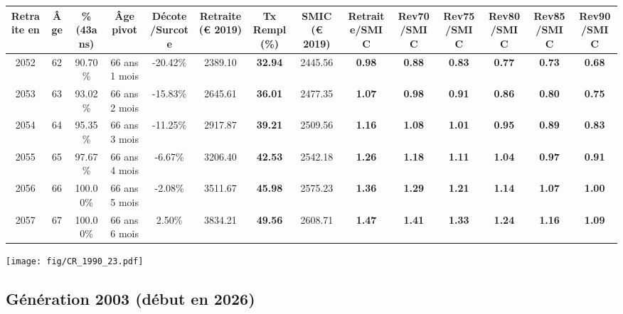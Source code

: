 \begin{adjustbox}{max width=\textwidth} 
\begin{tabular}[htb]{|c|c||c|c|c||c|c||c||c|c|c|c|c|c|} 
\hline 
 Retraite en &  Âge &  \%(43ans) &  Âge pivot &  Décote/Surcote &  Retraite (\euro{} 2019) &  Tx Rempl(\%) &  SMIC (\euro{} 2019) &  Retraite/SMIC &  Rev70/SMIC &  Rev75/SMIC &  Rev80/SMIC &  Rev85/SMIC &  Rev90/SMIC \\ 
\hline \hline 
 2052 &  62 &  90.70\% &  66 ans 1 mois &  -20.42\% &  2389.10 &  {\bf 32.94} &  2445.56 &  {\bf {\color{red} 0.98}} &  {\bf {\color{red} 0.88}} &  {\bf {\color{red} 0.83}} &  {\bf {\color{red} 0.77}} &  {\bf {\color{red} 0.73}} &  {\bf {\color{red} 0.68}} \\ 
\hline 
 2053 &  63 &  93.02\% &  66 ans 2 mois &  -15.83\% &  2645.61 &  {\bf 36.01} &  2477.35 &  {\bf 1.07} &  {\bf {\color{red} 0.98}} &  {\bf {\color{red} 0.91}} &  {\bf {\color{red} 0.86}} &  {\bf {\color{red} 0.80}} &  {\bf {\color{red} 0.75}} \\ 
\hline 
 2054 &  64 &  95.35\% &  66 ans 3 mois &  -11.25\% &  2917.87 &  {\bf 39.21} &  2509.56 &  {\bf 1.16} &  {\bf 1.08} &  {\bf 1.01} &  {\bf {\color{red} 0.95}} &  {\bf {\color{red} 0.89}} &  {\bf {\color{red} 0.83}} \\ 
\hline 
 2055 &  65 &  97.67\% &  66 ans 4 mois &  -6.67\% &  3206.40 &  {\bf 42.53} &  2542.18 &  {\bf 1.26} &  {\bf 1.18} &  {\bf 1.11} &  {\bf 1.04} &  {\bf {\color{red} 0.97}} &  {\bf {\color{red} 0.91}} \\ 
\hline 
 2056 &  66 &  100.00\% &  66 ans 5 mois &  -2.08\% &  3511.67 &  {\bf 45.98} &  2575.23 &  {\bf 1.36} &  {\bf 1.29} &  {\bf 1.21} &  {\bf 1.14} &  {\bf 1.07} &  {\bf 1.00} \\ 
\hline 
 2057 &  67 &  100.00\% &  66 ans 6 mois &  2.50\% &  3834.21 &  {\bf 49.56} &  2608.71 &  {\bf 1.47} &  {\bf 1.41} &  {\bf 1.33} &  {\bf 1.24} &  {\bf 1.16} &  {\bf 1.09} \\ 
\hline 
\hline 
\end{tabular} 
\end{adjustbox} 
 
 \vspace{0.1cm} 

 \begin{center}\texttt{[image: fig/CR\_1990\_23.pdf]}\end{center} \label{fig/CR_1990_23.pdf} 

\newpage 
 
\subsection{Génération 2003 (début en 2026)} 

